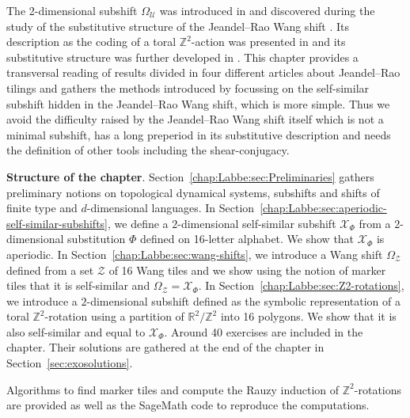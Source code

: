 \documentclass[12pt]{amsart}
\newcommand{\Z}{\mathbb{Z}}
\newcommand{\R}{\mathbb{R}}
\newcommand{\Ucal}{\mathcal{U}}
\newcommand{\Xcal}{\mathcal{X}} %
\newcommand{\Zcal}{\mathcal{Z}}
\begin{document}
The 2-dimensional subshift $\Omega_\Ucal$ was introduced in \cite{MR3978536} and
discovered during the study of the substitutive structure
\cite{MR4226493} of the Jeandel--Rao Wang shift
\cite{MR4210631}.
Its description as the coding of a toral $\Z^2$-action was presented in
\cite{MR4213162} and its substitutive structure was further developed
in \cite{MR4347332}.
This chapter provides a transversal reading of results divided in four different
articles about Jeandel--Rao tilings and gathers the methods introduced by focussing on the 
self-similar subshift hidden in the Jeandel--Rao Wang shift, which is more simple.
Thus we avoid the difficulty raised by the
Jeandel--Rao Wang shift itself which is not a minimal subshift, has a long preperiod
in its substitutive description and needs the definition of other tools
including the shear-conjugacy.


\textbf{Structure of the chapter}.
Section~\ref{chap:Labbe:sec:Preliminaries} gathers preliminary notions on
topological dynamical systems,
subshifts and shifts of finite type and $d$-dimensional languages.
In Section~\ref{chap:Labbe:sec:aperiodic-self-similar-subshifts}, we define a
$2$-dimensional self-similar subshift $\Xcal_\Phi$ from a $2$-dimensional substitution
$\Phi$ defined on 16-letter alphabet.
We show that $\Xcal_\Phi$ is aperiodic.
In Section~\ref{chap:Labbe:sec:wang-shifts}, we introduce a Wang shift
$\Omega_\Zcal$ defined from a set $\Zcal$ of 16 Wang tiles and we show using
the notion of marker tiles that it is self-similar and $\Omega_\Zcal=\Xcal_\Phi$.
In Section~\ref{chap:Labbe:sec:Z2-rotations}, we introduce a $2$-dimensional subshift
defined as the symbolic representation of a toral $\Z^2$-rotation using a
partition of $\R^2/\Z^2$ into 16 polygons. We show that it is also self-similar
and equal to $\Xcal_\Phi$. Around 40 exercises are included in the chapter. Their solutions
are gathered at the end of the chapter in Section~\ref{sec:exosolutions}.

Algorithms to find marker tiles and compute the Rauzy induction of
$\Z^2$-rotations are provided as well as the SageMath code to reproduce the
computations.
\end{document}

